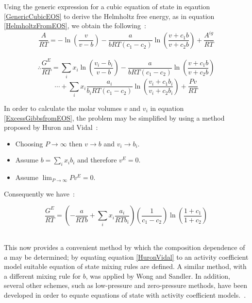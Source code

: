 Using the generic expression for a cubic equation of state in eqaution \ref{GenericCubicEOS} to derive the Helmholtz free energy, as in equation \ref{HelmholtzFromEOS}, we obtain the following~\cite{ThermophysicalProperties}:\
\begin{equation}
\dfrac{A}{RT} = -\ln \left(\dfrac{v}{v - b}\right) - \dfrac{a}{bRT\left(c_{1}- c_{2}\right)}\ln \left(\dfrac{v + c_{1}b}{v + c_{2}b}\right) + \dfrac{A^{ig}}{RT}
\end{equation}\
\begin{equation*}
\therefore \dfrac{G^{E}}{RT} =\sum_{i}x_{i}\ln \left(\dfrac{v_{i} - b_{i}}{v - b}\right) - \dfrac{a}{bRT\left(c_{1}- c_{2}\right)}\ln \left(\dfrac{v + c_{1}b}{v + c_{2}b}\right)
\end{equation*}
\begin{equation}
\cdots + \sum_{i} x_{i} \dfrac{a_{i}}{b_{i}RT\left(c_{1}- c_{2}\right)}\ln \left(\dfrac{v_{i} + c_{1}b_{i}}{v_{i} + c_{2}b_{i}}\right) + \dfrac{Pv}{RT} \label{ExcessGibbsfromEOS}
\end{equation}

In order to calculate the molar volumes $v$ and $v_{i}$ in equation \ref{ExcessGibbsfromEOS}, the problem may be simplified by using a method proposed by Huron and Vidal~\cite{HuronVidal, Vidal}:\
\begin{itemize}
 \item Choosing $P \rightarrow \infty$ then $v \rightarrow b$ and $v_{i} \rightarrow b_{i}$.\
 \item Assume $b = \sum_{i}x_{i}b_{i}$ and therefore $v^{E} = 0$.\
 \item Assume $ \lim_{P\rightarrow \infty} Pv^{E} = 0 $.\
 \end{itemize}
 Consequently we have~\cite{HuronVidal}:\
 
\begin{equation}
\dfrac{G^{E}}{RT} = \left( -\dfrac{a}{RTb} + \sum_{i} x_{i}\dfrac{a_{i}}{RTb_{i}}\right)\left(\dfrac{1}{c_{1}- c_{2}}\right)\ln\left(\dfrac{1+c_{1}}{1+ c_{2}}\right) \label{HuronVidal}
\end{equation}\

This now provides a convenient method by which the composition dependence of $a$ may be determined; by equating equation \ref{HuronVidal} to an activity coefficient model suitable equation of state mixing rules are defined. A similar method, with a different mixing rule for $b$, was applied by Wong and Sandler. In addition, several other schemes, such as low-pressure and zero-pressure methods, have been developed in order to equate equations of state with activity coefficient models.~\cite{WongSandler, Focke, ThermophysicalProperties, ActivityCoefficientEOSModels}.





